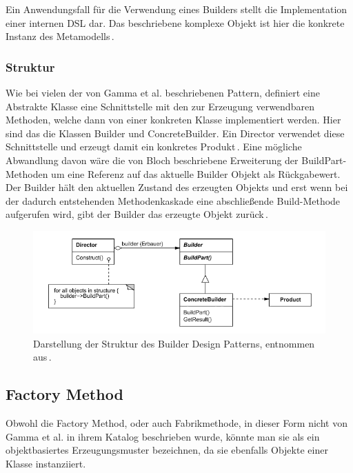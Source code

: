 \documentclass[12pt,oneside,a4paper,parskip]{scrbook}
\begin{document}
Ein Anwendungsfall für die Verwendung eines Builders stellt die Implementation einer internen DSL dar. Das beschriebene komplexe Objekt ist hier die konkrete Instanz des Metamodells\,\cite[S. 343ff.]{fowler2010}.

\subsubsection{Struktur}

Wie bei vielen der von Gamma et al. beschriebenen Pattern, definiert eine Abstrakte Klasse eine Schnittstelle mit den zur Erzeugung verwendbaren Methoden, welche dann von einer konkreten Klasse implementiert werden. Hier sind das die Klassen Builder und ConcreteBuilder. Ein Director verwendet diese Schnittstelle und erzeugt damit ein konkretes Produkt\,\cite[S. 162f.]{gamma2015}. Eine mögliche Abwandlung davon wäre die von Bloch beschriebene Erweiterung der BuildPart-Methoden um eine Referenz auf das aktuelle Builder Objekt als Rückgabewert. Der Builder hält den aktuellen Zustand des erzeugten Objekts und erst wenn bei der dadurch entstehenden Methodenkaskade eine abschließende Build-Methode aufgerufen wird, gibt der Builder das erzeugte Objekt zurück\,\cite[S. 13ff]{bloch2017}.

\begin{figure}[htbp]
	\centering
	\includegraphics[width=1.0\textwidth]{bilder/builder}
	\caption{Darstellung der Struktur des Builder Design Patterns, entnommen aus\,\cite[S. 162]{gamma2015}.}
	\label{fig:builder}
\end{figure}

\subsection{Factory Method}

Obwohl die Factory Method, oder auch Fabrikmethode, in dieser Form nicht von Gamma et al. in ihrem Katalog beschrieben wurde, könnte man sie als ein objektbasiertes Erzeugungsmuster bezeichnen, da sie ebenfalls Objekte einer Klasse instanziiert.
\end{document}
